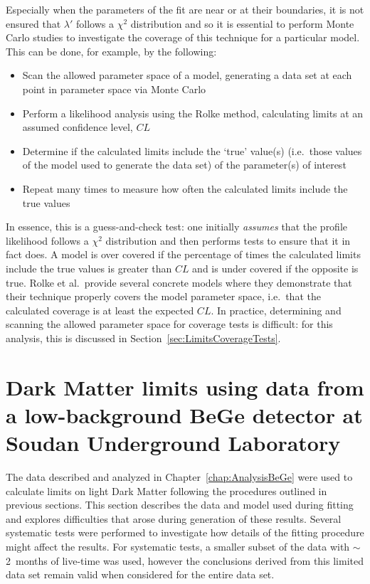  Especially when the parameters of the fit are near or at their boundaries, it is not ensured that $\lambda'$ follows a $\chi^{2}$ distribution and so it is essential to perform Monte Carlo studies to investigate the coverage of this technique for a particular model.  This can be done, for example, by the following:
		\begin{itemize}
			\item Scan the allowed parameter space of a model, 
			generating a data set at each point in parameter space via Monte Carlo
			\item Perform a likelihood analysis using the Rolke method, calculating limits at an 
			assumed confidence level, $CL$
			\item Determine if the calculated limits include the `true' value(s) (i.e.~those values of 
			the model used to generate the data set) of the parameter(s) of interest 
			\item Repeat many times to measure how often the calculated limits include the true values
		\end{itemize}			
In essence, this is a guess-and-check test: one initially \emph{assumes} that the profile likelihood follows a $\chi^{2}$ distribution and then performs tests to ensure that it in fact does.  A model is over covered if the percentage of times the calculated limits include the true values is greater than $CL$ and is under covered if the opposite is true.  Rolke et al.~provide several concrete models where they demonstrate that their technique properly covers the model parameter space, i.e.~that the calculated coverage is at least the expected $CL$.  In practice, determining and scanning the allowed parameter space for coverage tests is difficult: for this analysis, this is discussed in Section~\ref{sec:LimitsCoverageTests}.


\section{Dark Matter limits using data from a low-background BeGe detector at Soud\-an Underground Laboratory} 
\label{sec:DMLimitsWithSoudan}

	The data described and analyzed in Chapter~\ref{chap:AnalysisBeGe} were used to calculate limits on light Dark Matter following the procedures outlined in previous sections.  This section describes the data and model used during fitting and explores difficulties that arose during generation of these results.  Several systematic tests were performed to investigate how details of the fitting procedure might affect the results.  For systematic tests, a smaller subset of the data with $\sim$2~months of live-time was used, however the conclusions derived from this limited data set remain valid when considered for the entire data set.

